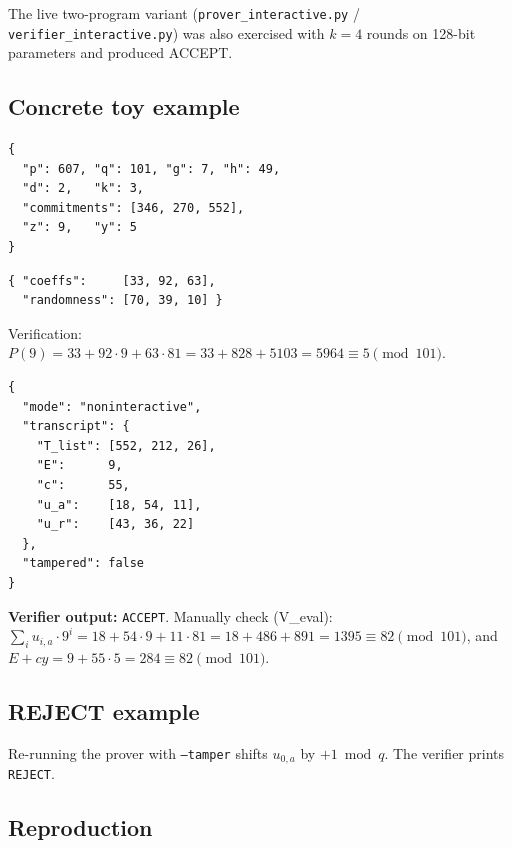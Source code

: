 \documentclass[11pt,a4paper]{article}
\begin{document}
The live two-program variant (\texttt{prover\_interactive.py} /
\texttt{verifier\_interactive.py}) was also exercised with $k=4$ rounds
on 128-bit parameters and produced ACCEPT.

\subsection{Concrete toy example}

\begin{lstlisting}[style=jsonstyle, caption={\texttt{public.json} (toy)}]
{
  "p": 607, "q": 101, "g": 7, "h": 49,
  "d": 2,   "k": 3,
  "commitments": [346, 270, 552],
  "z": 9,   "y": 5
}
\end{lstlisting}

\begin{lstlisting}[style=jsonstyle, caption={\texttt{private.json} (toy)}]
{ "coeffs":     [33, 92, 63],
  "randomness": [70, 39, 10] }
\end{lstlisting}

Verification: $P(9) = 33 + 92\cdot 9 + 63\cdot 81 = 33 + 828 + 5103 = 5964
\equiv 5 \pmod{101}$. \checkmark

\begin{lstlisting}[style=jsonstyle, caption={\texttt{proof.json}
(non-interactive, after running \texttt{main.py prover --mode noninteractive})}]
{
  "mode": "noninteractive",
  "transcript": {
    "T_list": [552, 212, 26],
    "E":      9,
    "c":      55,
    "u_a":    [18, 54, 11],
    "u_r":    [43, 36, 22]
  },
  "tampered": false
}
\end{lstlisting}

\textbf{Verifier output:} \texttt{ACCEPT}. Manually check (V\_eval):
$\sum_i u_{i,a}\cdot 9^{i} = 18 + 54\cdot 9 + 11\cdot 81
 = 18 + 486 + 891 = 1395 \equiv 82 \pmod{101}$, and
$E + cy = 9 + 55\cdot 5 = 284 \equiv 82 \pmod{101}$. \checkmark

\subsection{REJECT example}

Re-running the prover with \texttt{--tamper} shifts $u_{0,a}$ by $+1
\bmod q$. The verifier prints \texttt{REJECT}.

\subsection{Reproduction}
\end{document}
